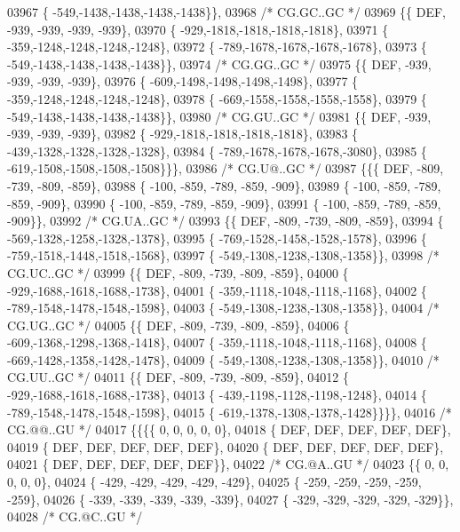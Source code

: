 \begin{DoxyCode}
03967 \{ -549,-1438,-1438,-1438,-1438\}\},
03968 \textcolor{comment}{/* CG.GC..GC */}
03969 \{\{  DEF, -939, -939, -939, -939\},
03970 \{ -929,-1818,-1818,-1818,-1818\},
03971 \{ -359,-1248,-1248,-1248,-1248\},
03972 \{ -789,-1678,-1678,-1678,-1678\},
03973 \{ -549,-1438,-1438,-1438,-1438\}\},
03974 \textcolor{comment}{/* CG.GG..GC */}
03975 \{\{  DEF, -939, -939, -939, -939\},
03976 \{ -609,-1498,-1498,-1498,-1498\},
03977 \{ -359,-1248,-1248,-1248,-1248\},
03978 \{ -669,-1558,-1558,-1558,-1558\},
03979 \{ -549,-1438,-1438,-1438,-1438\}\},
03980 \textcolor{comment}{/* CG.GU..GC */}
03981 \{\{  DEF, -939, -939, -939, -939\},
03982 \{ -929,-1818,-1818,-1818,-1818\},
03983 \{ -439,-1328,-1328,-1328,-1328\},
03984 \{ -789,-1678,-1678,-1678,-3080\},
03985 \{ -619,-1508,-1508,-1508,-1508\}\}\},
03986 \textcolor{comment}{/* CG.U@..GC */}
03987 \{\{\{  DEF, -809, -739, -809, -859\},
03988 \{ -100, -859, -789, -859, -909\},
03989 \{ -100, -859, -789, -859, -909\},
03990 \{ -100, -859, -789, -859, -909\},
03991 \{ -100, -859, -789, -859, -909\}\},
03992 \textcolor{comment}{/* CG.UA..GC */}
03993 \{\{  DEF, -809, -739, -809, -859\},
03994 \{ -569,-1328,-1258,-1328,-1378\},
03995 \{ -769,-1528,-1458,-1528,-1578\},
03996 \{ -759,-1518,-1448,-1518,-1568\},
03997 \{ -549,-1308,-1238,-1308,-1358\}\},
03998 \textcolor{comment}{/* CG.UC..GC */}
03999 \{\{  DEF, -809, -739, -809, -859\},
04000 \{ -929,-1688,-1618,-1688,-1738\},
04001 \{ -359,-1118,-1048,-1118,-1168\},
04002 \{ -789,-1548,-1478,-1548,-1598\},
04003 \{ -549,-1308,-1238,-1308,-1358\}\},
04004 \textcolor{comment}{/* CG.UG..GC */}
04005 \{\{  DEF, -809, -739, -809, -859\},
04006 \{ -609,-1368,-1298,-1368,-1418\},
04007 \{ -359,-1118,-1048,-1118,-1168\},
04008 \{ -669,-1428,-1358,-1428,-1478\},
04009 \{ -549,-1308,-1238,-1308,-1358\}\},
04010 \textcolor{comment}{/* CG.UU..GC */}
04011 \{\{  DEF, -809, -739, -809, -859\},
04012 \{ -929,-1688,-1618,-1688,-1738\},
04013 \{ -439,-1198,-1128,-1198,-1248\},
04014 \{ -789,-1548,-1478,-1548,-1598\},
04015 \{ -619,-1378,-1308,-1378,-1428\}\}\}\},
04016 \textcolor{comment}{/* CG.@@..GU */}
04017 \{\{\{\{    0,    0,    0,    0,    0\},
04018 \{  DEF,  DEF,  DEF,  DEF,  DEF\},
04019 \{  DEF,  DEF,  DEF,  DEF,  DEF\},
04020 \{  DEF,  DEF,  DEF,  DEF,  DEF\},
04021 \{  DEF,  DEF,  DEF,  DEF,  DEF\}\},
04022 \textcolor{comment}{/* CG.@A..GU */}
04023 \{\{    0,    0,    0,    0,    0\},
04024 \{ -429, -429, -429, -429, -429\},
04025 \{ -259, -259, -259, -259, -259\},
04026 \{ -339, -339, -339, -339, -339\},
04027 \{ -329, -329, -329, -329, -329\}\},
04028 \textcolor{comment}{/* CG.@C..GU */}

\end{DoxyCode}
